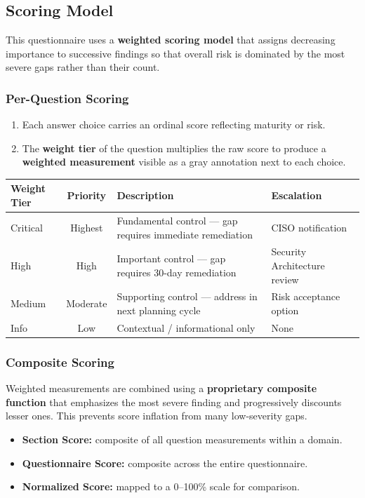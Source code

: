 \documentclass[11pt,landscape]{article}
\begin{document}
\subsection{Scoring Model}

This questionnaire uses a \textbf{weighted scoring model} that assigns decreasing
importance to successive findings so that overall risk is dominated by the most
severe gaps rather than their count.

\subsubsection*{Per-Question Scoring}
\begin{enumerate}[leftmargin=*]
    \item Each answer choice carries an ordinal score reflecting maturity or risk.
    \item The \textbf{weight tier} of the question multiplies the raw score to
          produce a \textbf{weighted measurement} visible as a gray annotation
          next to each choice.
\end{enumerate}

\begin{tabularx}{\textwidth}{lcXl}
\toprule
\textbf{Weight Tier} & \textbf{Priority} & \textbf{Description} & \textbf{Escalation} \\
\midrule
\colorbox{critbg}{Critical} & Highest & Fundamental control --- gap requires immediate remediation & CISO notification \\
\colorbox{highbg}{High} & High & Important control --- gap requires 30-day remediation & Security Architecture review \\
\colorbox{medbg}{Medium} & Moderate & Supporting control --- address in next planning cycle & Risk acceptance option \\
Info & Low & Contextual / informational only & None \\
\bottomrule
\end{tabularx}

\subsubsection*{Composite Scoring}

Weighted measurements are combined using a \textbf{proprietary composite function}
that emphasizes the most severe finding and progressively discounts lesser ones.
This prevents score inflation from many low-severity gaps.

\begin{itemize}[leftmargin=*]
    \item \textbf{Section Score:} composite of all question measurements within a domain.
    \item \textbf{Questionnaire Score:} composite across the entire questionnaire.
    \item \textbf{Normalized Score:} mapped to a 0--100\% scale for comparison.
\end{itemize}
\end{document}
